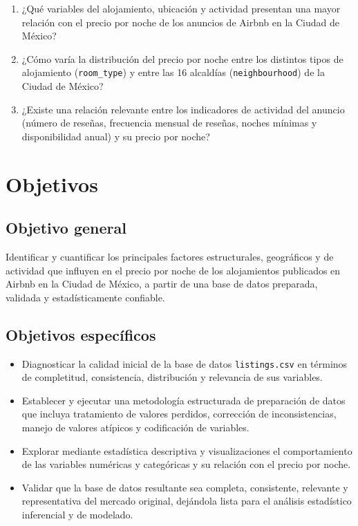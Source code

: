 \documentclass[12pt,letterpaper,oneside]{report}
\begin{document}
\begin{enumerate}[leftmargin=1.5em]
  \item ¿Qué variables del alojamiento, ubicación y actividad presentan una mayor relación con el precio por noche de los anuncios de Airbnb en la Ciudad de México?
  \item ¿Cómo varía la distribución del precio por noche entre los distintos tipos de alojamiento (\texttt{room\_type}) y entre las 16 alcaldías (\texttt{neighbourhood}) de la Ciudad de México?
  \item ¿Existe una relación relevante entre los indicadores de actividad del anuncio (número de reseñas, frecuencia mensual de reseñas, noches mínimas y disponibilidad anual) y su precio por noche?
\end{enumerate}

\section{Objetivos}

\subsection{Objetivo general}
Identificar y cuantificar los principales factores estructurales, geográficos y de actividad que influyen en el precio por noche de los alojamientos publicados en Airbnb en la Ciudad de México, a partir de una base de datos preparada, validada y estadísticamente confiable.

\subsection{Objetivos específicos}
\begin{itemize}[leftmargin=1.5em]
  \item Diagnosticar la calidad inicial de la base de datos \texttt{listings.csv} en términos de completitud, consistencia, distribución y relevancia de sus variables.
  \item Establecer y ejecutar una metodología estructurada de preparación de datos que incluya tratamiento de valores perdidos, corrección de inconsistencias, manejo de valores atípicos y codificación de variables.
  \item Explorar mediante estadística descriptiva y visualizaciones el comportamiento de las variables numéricas y categóricas y su relación con el precio por noche.
  \item Validar que la base de datos resultante sea completa, consistente, relevante y representativa del mercado original, dejándola lista para el análisis estadístico inferencial y de modelado.
\end{itemize}
\end{document}
